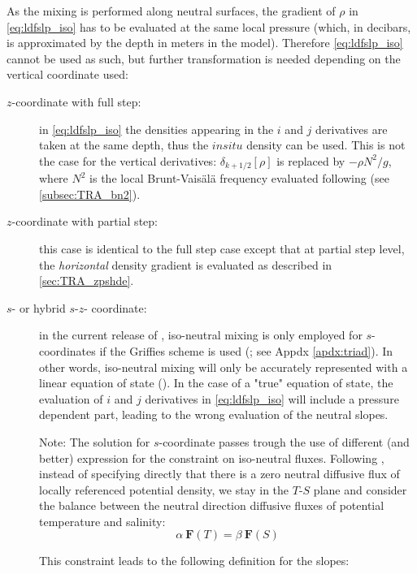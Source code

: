\documentclass[../main/NEMO_manual]{subfiles}
\begin{document}
As the mixing is performed along neutral surfaces, the gradient of $\rho$ in \autoref{eq:ldfslp_iso} has to
be evaluated at the same local pressure
(which, in decibars, is approximated by the depth in meters in the model).
Therefore \autoref{eq:ldfslp_iso} cannot be used as such,
but further transformation is needed depending on the vertical coordinate used:

\begin{description}

\item[$z$-coordinate with full step: ]
  in \autoref{eq:ldfslp_iso} the densities appearing in the $i$ and $j$ derivatives  are taken at the same depth,
  thus the $in situ$ density can be used.
  This is not the case for the vertical derivatives: $\delta_{k+1/2}[\rho]$ is replaced by $-\rho N^2/g$,
  where $N^2$ is the local Brunt-Vais\"{a}l\"{a} frequency evaluated following \citet{McDougall1987}
  (see \autoref{subsec:TRA_bn2}). 

\item[$z$-coordinate with partial step: ]
  this case is identical to the full step case except that at partial step level,
  the \emph{horizontal} density gradient is evaluated as described in \autoref{sec:TRA_zpshde}.

\item[$s$- or hybrid $s$-$z$- coordinate: ]
  in the current release of \NEMO, iso-neutral mixing is only employed for $s$-coordinates if
  the Griffies scheme is used (;
  see Appdx \autoref{apdx:triad}).
  In other words, iso-neutral mixing will only be accurately represented with a linear equation of state
  ().
  In the case of a "true" equation of state, the evaluation of $i$ and $j$ derivatives in \autoref{eq:ldfslp_iso}
  will include a pressure dependent part, leading to the wrong evaluation of the neutral slopes.

  Note: The solution for $s$-coordinate passes trough the use of different (and better) expression for
  the constraint on iso-neutral fluxes.
  Following \citet{Griffies_Bk04}, instead of specifying directly that there is a zero neutral diffusive flux of
  locally referenced potential density, we stay in the $T$-$S$ plane and consider the balance between
  the neutral direction diffusive fluxes of potential temperature and salinity:
  \[
    \alpha \ \textbf{F}(T) = \beta \ \textbf{F}(S)
  \]

This constraint leads to the following definition for the slopes:


\end{description}
\end{document}
